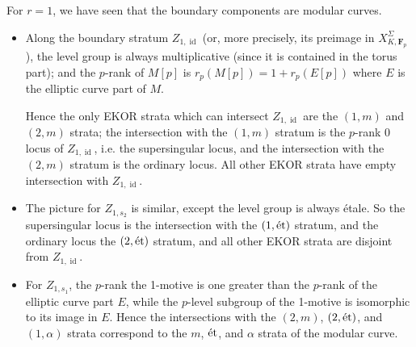 \documentclass[cjm]{ipart}
\theoremstyle{plain}
\theoremstyle{remark}
\DeclareMathOperator{\id}{id}
\newcommand{\Fp}{\mathbf{F}_p}
\newcommand{\et}{\text{\textup{\'et}}}
\numberwithin{equation}{subsection}
\begin{document}
   For $r = 1$, we have seen that the boundary components are modular curves.

   \begin{itemize}
    \item Along the boundary stratum $Z_{1, \id}$ (or, more precisely, its preimage in $X_{K, \Fp}^{\Sigma}$), the level group is always multiplicative (since it is contained in the torus part); and the $p$-rank of $M[p]$ is $r_p(M[p]) = 1 + r_p(E[p])$ where $E$ is the elliptic curve part of $M$.

    Hence the only EKOR strata which can intersect $Z_{1, \id}$ are the $(1, m)$ and $(2, m)$ strata; the intersection with the $(1, m)$ stratum is the $p$-rank 0 locus of $Z_{1, \id}$, i.e. the supersingular locus, and the intersection with the $(2, m)$ stratum is the ordinary locus. All other EKOR strata have empty intersection with $Z_{1, \id}$.

    \item The picture for $Z_{1, s_2}$ is similar, except the level group is always \'etale. So the supersingular locus is the intersection with the $(1, \et)$ stratum, and the ordinary locus the $(2, \et)$ stratum, and all other EKOR strata are disjoint from $Z_{1, \id}$.

    \item For $Z_{1, s_1}$, the $p$-rank the 1-motive is one greater than the $p$-rank of the elliptic curve part $E$, while the $p$-level subgroup of the 1-motive is isomorphic to its image in $E$. Hence the intersections with the $(2, m)$, $(2, \et)$, and $(1, \alpha)$ strata correspond to the $m$, $\et$, and $\alpha$ strata of the modular curve.
   \end{itemize}
\end{document}
